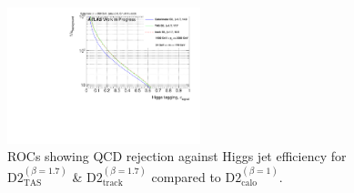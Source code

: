 \begin{figure}
\bigskip
\includegraphics[width=0.5\textwidth]{sascha_input/Appendix/Higgs_best/ROC_ALL_h_recoJet_D2_17_bin5.pdf} 
\caption{\footnotesize{ROCs showing QCD rejection against Higgs jet efficiency for $\text{D2}_{\text{TAS}}^{(\beta=1.7)}$ \& $\text{D2}_{\text{track}}^{(\beta=1.7)}$ compared to $\text{D2}_{\text{calo}}^{(\beta=1)}$.}}
\end{figure}
